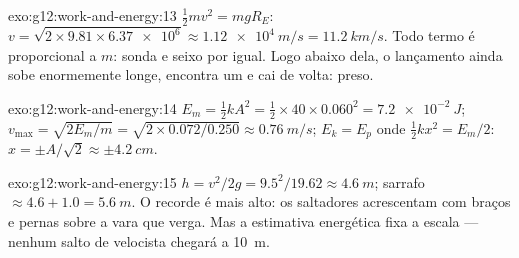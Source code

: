 \begin{solution}{exo:g12:work-and-energy:13}
$\tfrac12 mv^2 = mgR_E$:
$v = \sqrt{2 \times 9.81 \times \num{6.37e6}} \approx \qty{1.12e4}{m/s}
= \qty{11.2}{km/s}$. Todo termo é proporcional a $m$: sonda e seixo por
igual. Logo abaixo dela, o lançamento ainda sobe enormemente longe,
encontra um  e cai de volta: preso.
\end{solution}

\begin{solution}{exo:g12:work-and-energy:14}
$E_m = \tfrac12 kA^2 = \tfrac12 \times 40 \times 0.060^2 =
\qty{7.2e-2}{J}$; $v_{\max} = \sqrt{2E_m/m} =
\sqrt{2 \times 0.072/0.250} \approx \qty{0.76}{m/s}$; $E_k = E_p$ onde
$\tfrac12 kx^2 = E_m/2$: $x = \pm A/\sqrt 2 \approx \pm\qty{4.2}{cm}$.
\end{solution}

\begin{solution}{exo:g12:work-and-energy:15}
$h = v^2/2g = 9.5^2/19.62 \approx \qty{4.6}{m}$; sarrafo $\approx
4.6 + 1.0 = \qty{5.6}{m}$. O recorde é mais alto: os saltadores
acrescentam  com braços e pernas sobre a vara que verga. Mas a
estimativa energética fixa a escala --- nenhum salto de velocista
chegará a \qty{10}{m}.
\end{solution}

